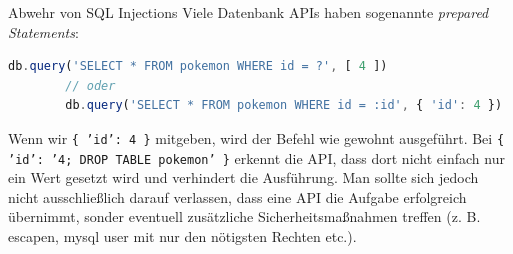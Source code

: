 \begin{bonus}{Abwehr von SQL Injections}
    Viele Datenbank APIs haben sogenannte \emph{prepared Statements}:

    \begin{lstlisting}[language=JavaScript]
        db.query('SELECT * FROM pokemon WHERE id = ?', [ 4 ])
        // oder
        db.query('SELECT * FROM pokemon WHERE id = :id', { 'id': 4 })
    \end{lstlisting}

    Wenn wir \texttt{\{ 'id': 4 \}} mitgeben, wird der Befehl wie gewohnt ausgeführt.
    Bei \texttt{\{ 'id': '4; DROP TABLE pokemon' \}} erkennt die API, dass dort nicht einfach nur ein Wert gesetzt wird und verhindert die Ausführung.
    Man sollte sich jedoch nicht ausschließlich darauf verlassen, dass eine API die Aufgabe erfolgreich übernimmt, sonder eventuell zusätzliche Sicherheitsmaßnahmen treffen (z. B. escapen, mysql user mit nur den nötigsten Rechten etc.).
\end{bonus}

